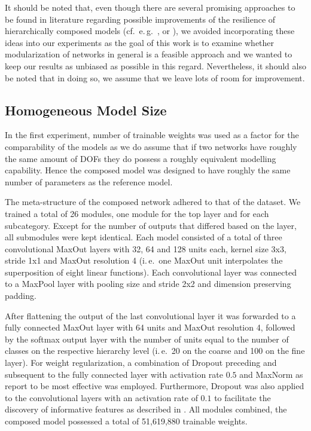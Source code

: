 \documentclass[conference]{IEEEtran}
\begin{document}
It should be noted that, even though there are several promising approaches to be found in literature regarding possible improvements of the resilience of hierarchically composed models (cf.\ e.\,g.\ \cite{Fergus2010-or}, \cite{Deng2014-so} or \cite{Roy2020-rv}), we avoided incorporating these ideas into our experiments as the goal of this work is to examine whether modularization of networks in general is a feasible approach and we wanted to keep our results as unbiased as possible in this regard. Nevertheless, it should also be noted that in doing so, we assume that we leave lots of room for improvement.

\subsection{Homogeneous Model Size%
            \label{sec:experiments_1}}

In the first experiment, number of trainable weights was used as a factor for the comparability of the models as we do assume that if two networks have roughly the same amount of DOFs they do possess a roughly equivalent modelling capability. Hence the composed model was designed to have roughly the same number of parameters as the reference model. 

The meta-structure of the composed network adhered to that of the dataset. We trained a total of 26 modules, one module for the top layer and for each subcategory. Except for the number of outputs that differed based on the layer, all submodules were kept identical. Each model consisted of a total of three convolutional MaxOut layers with 32, 64 and 128 units each, kernel size 3x3, stride 1x1 and MaxOut resolution 4 (i.\,e.\ one MaxOut unit interpolates the superposition of eight linear functions). Each convolutional layer was connected to a MaxPool layer with pooling size and stride 2x2 and dimension preserving padding.

After flattening the output of the last convolutional layer it was forwarded to a fully connected MaxOut layer with 64 units and MaxOut resolution 4, followed by the softmax output layer with the number of units equal to the number of classes on the respective hierarchy level (i.\,e.\ 20 on the coarse and 100 on the fine layer). For weight regularization, a combination of Dropout preceding and subsequent to the fully connected layer with activation rate $0.5$ and MaxNorm as \cite{Srivastava2014-pi} report to be most effective was employed. Furthermore, Dropout was also applied to the convolutional layers with an activation rate of $0.1$ to facilitate the discovery of informative features as described in \cite{Park2017-og}. All modules combined, the composed model possessed a total of 51,619,880 trainable weights.
\end{document}
